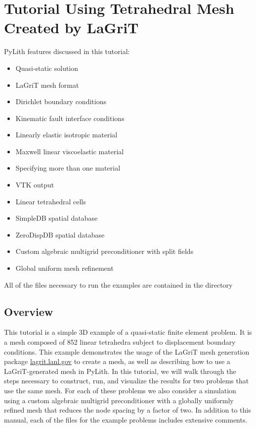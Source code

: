 \section{Tutorial Using Tetrahedral Mesh Created by LaGriT}
\label{sec:example:3dtet4}

PyLith features discussed in this tutorial:
\begin{itemize}
\item Quasi-static solution
\item LaGriT mesh format
\item Dirichlet boundary conditions
\item Kinematic fault interface conditions
\item Linearly elastic isotropic material
\item Maxwell linear viscoelastic material
\item Specifying more than one material
\item VTK output
\item Linear tetrahedral cells
\item SimpleDB spatial database
\item ZeroDispDB spatial database
\item Custom algebraic multigrid preconditioner with split fields
\item Global uniform mesh refinement
\end{itemize}
All of the files necessary to run the examples are contained in the
directory 


\subsection{Overview}

This tutorial is a simple 3D example of a quasi-static finite element
problem. It is a mesh composed of 852 linear tetrahedra subject to
displacement boundary conditions. This example demonstrates the usage
of the LaGriT mesh generation package \url{lagrit.lanl.gov} to create
a mesh, as well as describing how to use a LaGriT-generated mesh in
PyLith. In this tutorial, we will walk through the steps necessary
to construct, run, and visualize the results for two problems that
use the same mesh. For each of these problems we also consider a simulation
using a custom algebraic multigrid preconditioner with a globally
uniformly refined mesh that reduces the node spacing by a factor of
two. In addition to this manual, each of the files for the example
problems includes extensive comments.


